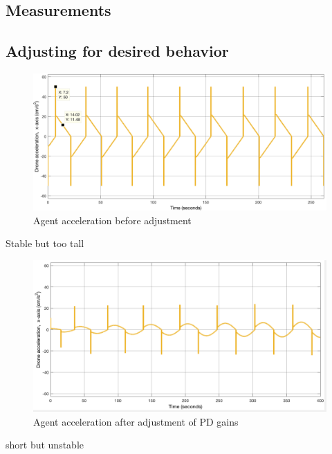 \subsection{Measurements}


\subsection{Adjusting for desired behavior}
\label{sec:tuning}

\begin{figure}[H]
  \centering
  \includegraphics[width=1\columnwidth]{figures/SA_accel_pre_adjustment}
  \caption{\label{fig:pre_adjust}Agent acceleration before adjustment}
\end{figure}

Stable but too tall

\begin{figure}[H]
  \centering
  \includegraphics[width=1\columnwidth]{figures/SA_accel_pre_post_p_adjustment}
  \caption{\label{fig:post_adjust}Agent acceleration after adjustment of PD gains}
\end{figure}

short but unstable

